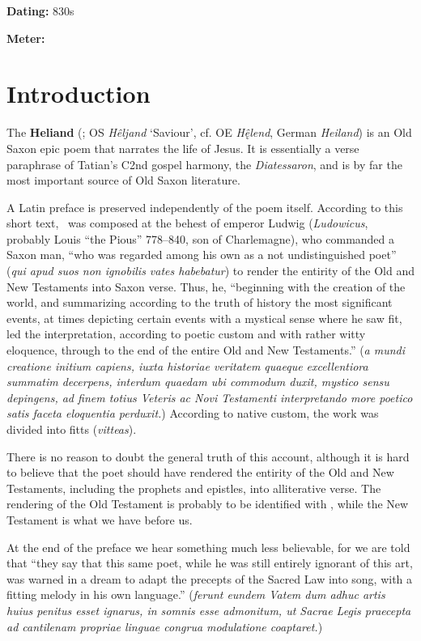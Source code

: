 \def\thisBookCode{Heliand}

\begin{flushright}%
\textbf{Dating:} 830s

\textbf{Meter:} \Fornyrdislag%
\end{flushright}%

\section{Introduction}

The \textbf{Heliand} (\Heliand; OS \emph{Hêljand} ‘Saviour’, cf. OE \emph{Hę̂lend}, German \emph{Heiland}) is an Old Saxon epic poem that narrates the life of Jesus.  It is essentially a verse paraphrase of Tatian’s C2nd gospel harmony, the \emph{Diatessaron}, and is by far the most important source of Old Saxon literature.

A Latin preface is preserved independently of the poem itself.  According to this short text, \Heliand\ was composed at the behest of emperor Ludwig (\emph{Ludowicus}, probably Louis “the Pious” 778–840, son of Charlemagne), who commanded a Saxon man, “who was regarded among his own as a not undistinguished poet” (\emph{qui apud suos non ignobilis vates habebatur}) to render the entirity of the Old and New Testaments into Saxon verse.  Thus, he, “beginning with the creation of the world, and summarizing according to the truth of history the most significant events, at times depicting certain events with a mystical sense where he saw fit, led the interpretation, according to poetic custom and with rather witty eloquence, through to the end of the entire Old and New Testaments.” (\emph{a mundi creatione initium capiens, iuxta historiae veritatem quaeque excellentiora summatim decerpens, interdum quaedam ubi commodum duxit, mystico sensu depingens, ad finem totius Veteris ac Novi Testamenti interpretando more poetico satis faceta eloquentia perduxit.})  According to native custom, the work was divided into fitts (\emph{vitteas}).

There is no reason to doubt the general truth of this account, although it is hard to believe that the poet should have rendered the entirity of the Old and New Testaments, including the prophets and epistles, into alliterative verse.  The rendering of the Old Testament is probably to be identified with \SaxonGenesis, while the New Testament is what we have before us.

At the end of the preface we hear something much less believable, for we are told that “they say that this same poet, while he was still entirely ignorant of this art, was warned in a dream to adapt the precepts of the Sacred Law into song, with a fitting melody in his own language.” (\emph{ferunt eundem Vatem dum adhuc artis huius penitus esset ignarus, in somnis esse admonitum, ut Sacrae Legis praecepta ad cantilenam propriae linguae congrua modulatione coaptaret.})

